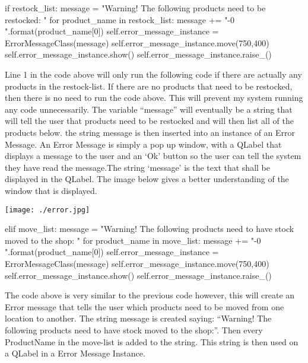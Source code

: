 \begin{python}
if restock_list:
            message = "Warning! \n \n The following products need to be restocked: \n \n "
            for product_name in restock_list:
                message += "-{0} \n".format(product_name[0])
            self.error_message_instance = ErrorMessageClass(message)
            self.error_message_instance.move(750,400)
            self.error_message_instance.show()
            self.error_message_instance.raise_()
\end{python}

Line 1 in the code above will only run the following code if there are actually any products in the restock-list. If there are no products that need to be restocked, then there is no need to run the code above. This will prevent my system running any code unnecessarily. The variable ``message'' will eventually be a string that will tell the user that products need to be restocked and will then list all of the products below. the string message is then inserted into an instance of an Error Message. An Error Message is simply a pop up window, with a QLabel that displays a message to the user and an `Ok' button so the user can tell the system they have read the message.The string `message' is the text that shall be displayed in the QLabel. The image below gives a better understanding of the window that is displayed.

\texttt{[image: ./error.jpg]}
\label{fig:move-stock-message}

\begin{python}
elif move_list:
            message = "Warning! \n \n The following products need to have stock moved to the shop: \n \n"
            for product_name in move_list:
                message += "-{0} \n".format(product_name[0])
            self.error_message_instance = ErrorMessageClass(message)
            self.error_message_instance.move(750,400)
            self.error_message_instance.show()
            self.error_message_instance.raise_()
\end{python}

The code above is very similar to the previous code however, this will create an Error message that tells the user which products need to be moved from one location to another. The string message is created saying: ``Warning! The following products need to have stock moved to the shop:''. Then every ProductName in the move-list is added to the string. This string is then used on a QLabel in a Error Message Instance.

